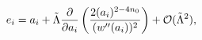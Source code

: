 \begin{equation}
e_{i}=a_{i}+\tilde{\Lambda}\frac{\partial }{\partial a_{i}}\left( \frac{%
2(a_{i})^{2-4n_{0}}}{(w^{\prime \prime }(a_{i}))^{2}}\right) +{\cal O}(%
\tilde{\Lambda}^{2}),
\end{equation}

